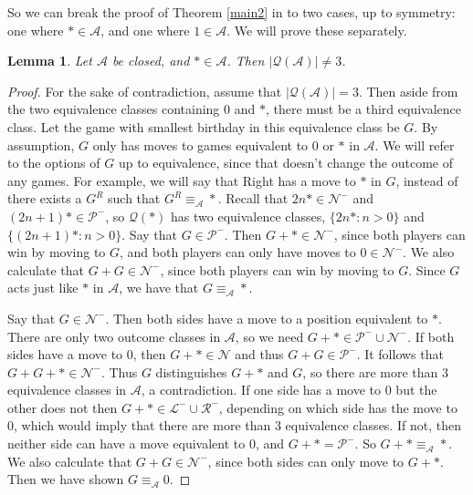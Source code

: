 \documentclass{amsart}
\theoremstyle{plain}
\newtheorem{lemma}[thm]{Lemma}
\theoremstyle{definition}
\theoremstyle{remark}
\numberwithin{equation}{section}
\numberwithin{thm}{section}
\begin{document}
So we can break the proof of Theorem \ref{main2} in to two cases, up to symmetry: one where $* \in \mathscr{A}$, and one where $1 \in \mathscr{A}$. We will prove these separately.

\begin{lemma}
    \label{no star}
    Let $\mathscr{A}$ be closed, and $* \in \mathscr{A}$. Then $|\mathcal{Q}(\mathscr{A})| \neq 3$.
\end{lemma}
\begin{proof}
   For the sake of contradiction, assume that $|\mathcal{Q}(\mathscr{A})| = 3$. Then aside from the two equivalence classes containing $0$ and $*$, there must be a third equivalence class. Let the game with smallest birthday in this equivalence class be $G$. By assumption, $G$ only has moves to games equivalent to $0$ or $*$ in $\mathscr{A}$. We will refer to the options of $G$ up to equivalence, since that doesn't change the outcome of any games. For example, we will say that Right has a move to $*$ in $G$, instead of there exists a $G^R$ such that $G^R \equiv_{\mathscr{A}} *$.
   Recall that $2n* \in \mathcal{N}^-$ and $(2n+1)*\in \mathcal{P}^-$, so $\mathcal{Q}(*)$ has two equivalence classes, $\{ 2n* : n>0\}$ and $\{(2n+1 )*: n>0\}$.
Say that $G \in \mathcal{P}^-$. Then $G+* \in \mathcal{N}^-$, since both players can win by moving to $G$, and both players can only have moves to $0 \in \mathcal{N}^-$. We also calculate that $G+G \in \mathcal{N}^-$, since both players can win by moving to $G$. Since $G$ acts just like $*$ in $\mathscr{A}$, we have that $G \equiv_{\mathscr{A}} *$.

Say that $G \in \mathcal{N}^-$. Then both sides have a move to a position equivalent to $*$. There are only two outcome classes in $\mathscr{A}$, so we need $G+* \in \mathcal{P}^- \cup\mathcal{N}^-$. 
If both sides have a move to $0$, then $G+* \in \mathcal{N}$ and thus $G+G \in \mathcal{P}^-$. It follows that $G+G+* \in \mathcal{N}^-$. Thus $G$ distinguishes $G+*$ and $G$, so there are more than $3$ equivalence classes in $\mathscr{A}$, a contradiction.
If one side has a move to $0$ but the other does not then $G+* \in \mathcal{L}^- \cup \mathcal{R}^-$, depending on which side has the move to $0$, which would imply that there are more than $3$ equivalence classes.
If not, then neither side can have a move equivalent to $0$, and $G +* = \mathcal{P}^-$. So $G+* \equiv_{\mathscr{A}} *$. We also calculate that $G+G \in \mathcal{N}^-$, since both sides can only move to $G+*$. Then we have shown $G \equiv_{\mathscr{A}} 0$.


\end{proof}
\end{document}

